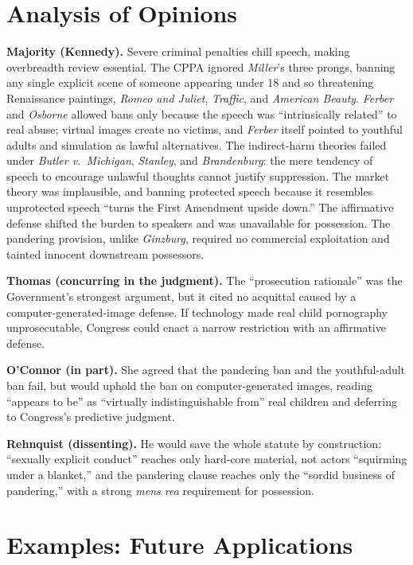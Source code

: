 \documentclass[12pt]{article}
\begin{document}
\section{Analysis of Opinions}

\textbf{Majority (Kennedy).} Severe criminal penalties chill speech, making overbreadth review essential. The CPPA ignored \textit{Miller}'s three prongs, banning any single explicit scene of someone appearing under 18 and so threatening Renaissance paintings, \textit{Romeo and Juliet}, \textit{Traffic}, and \textit{American Beauty}. \textit{Ferber} and \textit{Osborne} allowed bans only because the speech was ``intrinsically related'' to real abuse; virtual images create no victims, and \textit{Ferber} itself pointed to youthful adults and simulation as lawful alternatives. The indirect-harm theories failed under \textit{Butler v.\ Michigan}, \textit{Stanley}, and \textit{Brandenburg}: the mere tendency of speech to encourage unlawful thoughts cannot justify suppression. The market theory was implausible, and banning protected speech because it resembles unprotected speech ``turns the First Amendment upside down.'' The affirmative defense shifted the burden to speakers and was unavailable for possession. The pandering provision, unlike \textit{Ginzburg}, required no commercial exploitation and tainted innocent downstream possessors.

\textbf{Thomas (concurring in the judgment).} The ``prosecution rationale'' was the Government's strongest argument, but it cited no acquittal caused by a computer-generated-image defense. If technology made real child pornography unprosecutable, Congress could enact a narrow restriction with an affirmative defense.

\textbf{O'Connor (in part).} She agreed that the pandering ban and the youthful-adult ban fail, but would uphold the ban on computer-generated images, reading ``appears to be'' as ``virtually indistinguishable from'' real children and deferring to Congress's predictive judgment.

\textbf{Rehnquist (dissenting).} He would save the whole statute by construction: ``sexually explicit conduct'' reaches only hard-core material, not actors ``squirming under a blanket,'' and the pandering clause reaches only the ``sordid business of pandering,'' with a strong \textit{mens rea} requirement for possession.

\section{Examples: Future Applications}
\end{document}
